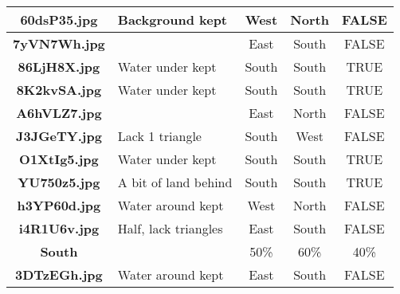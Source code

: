 \documentclass{article}
\begin{document}
\begin{table}[h!]
{\begin{tabular}{|c|p{4cm}|c|c|c|}
            \textbf{60dsP35.jpg} & Background kept              & West                          & North                            & FALSE                \\ \hline
            \rowcolor{gray!10}
            \textbf{7yVN7Wh.jpg} &                              & East                          & South                            & FALSE                \\ \hline
            \rowcolor{gray!0}
            \textbf{86LjH8X.jpg} & Water under kept             & South                         & South                            & TRUE                 \\ \hline
            \rowcolor{gray!10}
            \textbf{8K2kvSA.jpg} & Water under kept             & South                         & South                            & TRUE                 \\ \hline
            \rowcolor{gray!0}
            \textbf{A6hVLZ7.jpg} &                              & East                          & North                            & FALSE                \\ \hline
            \rowcolor{gray!10}
            \textbf{J3JGeTY.jpg} & Lack 1 triangle              & South                         & West                             & FALSE                \\ \hline
            \rowcolor{gray!0}
            \textbf{O1XtIg5.jpg} & Water under kept             & South                         & South                            & TRUE                 \\ \hline
            \rowcolor{gray!10}
            \textbf{YU750z5.jpg} & A bit of land behind         & South                         & South                            & TRUE                 \\ \hline
            \rowcolor{gray!0}
            \textbf{h3YP60d.jpg} & Water around kept            & West                          & North                            & FALSE                \\ \hline
            \rowcolor{gray!10}
            \textbf{i4R1U6v.jpg} & Half, lack triangles         & East                          & South                            & FALSE                \\ \hline
            \rowcolor{gray!40}
            \textbf{South}       &                              & 50\%                          & 60\%                             & 40\%                 \\ \hline
            \rowcolor{gray!0}
            \textbf{3DTzEGh.jpg} & Water around kept            & East                          & South                            & FALSE                \\ \hline

\end{tabular}}
\end{table}
\end{document}
